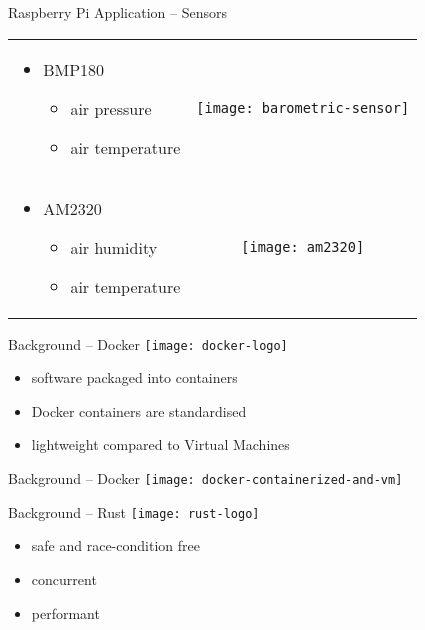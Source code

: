 \documentclass[aspectratio=1610]{beamer}
\begin{document}
  \begin{frame}{Raspberry Pi Application -- Sensors}
    \begin{tabularx}{\textwidth}{XC}
      \begin{itemize}
        \item BMP180
          \begin{itemize}
            \item air pressure
            \item air temperature
          \end{itemize}
      \end{itemize}
      &
      \texttt{[image: barometric-sensor]}
      \\
      \begin{itemize}
        \item AM2320
          \begin{itemize}
            \item air humidity
            \item air temperature
          \end{itemize}
      \end{itemize}
      &
      \texttt{[image: am2320]}
    \end{tabularx}
  \end{frame}

  \begin{frame}{Background -- Docker}
    \texttt{[image: docker-logo]}

    \vspace*{1.5em}

    \begin{itemize}
      \item software packaged into containers
      \item Docker containers are standardised
      \item lightweight compared to Virtual Machines
    \end{itemize}
  \end{frame}

  \begin{frame}{Background -- Docker}
    \vfill
    \texttt{[image: docker-containerized-and-vm]}
  \end{frame}

  \begin{frame}{Background -- Rust}
    \texttt{[image: rust-logo]}

    \vspace*{1.5em}

    \begin{itemize}
      \item safe and race-condition free
      \item concurrent
      \item performant
    \end{itemize}
  \end{frame}
\end{document}

